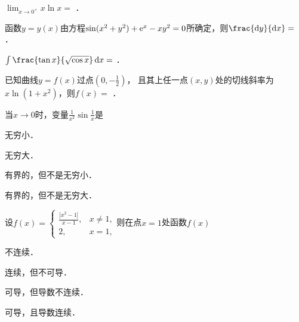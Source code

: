 \documentclass[plain,noanswer,medmath]{../../template/jnuexam}
\begin{document}






\begin{problem}
$\lim_{x \to 0^+} x\ln x =$ \fillin{}．
\end{problem}


\begin{problem}
函数$y = y(x)$由方程$\sin (x^2 + y^2) + \mathrm{e}^x - xy^2 = 0$所确定，则$\frac{\dy}{\dx} =$ \fillin{}．
\end{problem}




\begin{problem}
$\int \frac{\tan x}{\sqrt{\cos x}} \dx =$ \fillin{}．
\end{problem}


\begin{problem}
已知曲线$y = f(x)$过点$\left(0, - \frac{1}{2} \right)$，
且其上任一点$(x,y)$处的切线斜率为$x\ln(1 + x^2)$，则$f(x)=$ \fillin{}．
\end{problem}




\begin{problem}
当$x \to 0$时，变量$\frac{1}{x^2}\sin \frac{1}{x}$是\pickout{}
\begin{abcd}
\item 无穷小．						
\item 无穷大．
\item 有界的，但不是无穷小．		
\item 有界的，但不是无穷大．
\end{abcd}
\end{problem}


\begin{problem}
设$f(x) = \begin{cases}
 \frac{|x^2-1|}{x-1}, & x \ne 1, \\
                   2, & x = 1,
\end{cases}$则在点$x=1$处函数$f(x)$\pickout{}
\begin{abcd}
\item 不连续．
\item 连续，但不可导．
\item 可导，但导数不连续．
\item 可导，且导数连续．
\end{abcd}
\end{problem}
\end{document}

